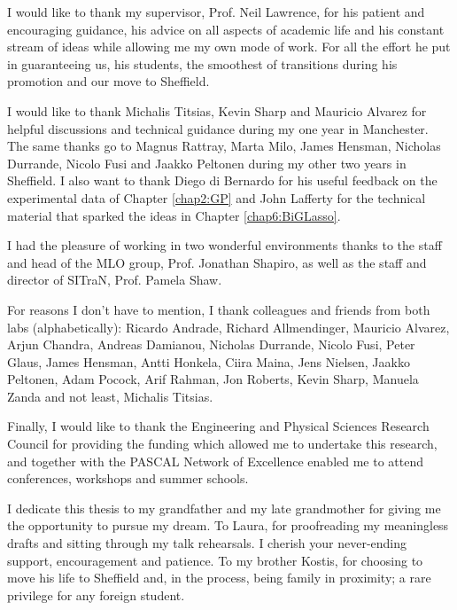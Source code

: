 

\begin{acknowledgements}      %

I would like to thank my supervisor, Prof. Neil Lawrence, for his patient and encouraging guidance, his advice on all aspects of academic life and his constant stream of ideas while allowing me my own mode of work.
For all the effort he put in guaranteeing us, his students, the smoothest of transitions during his promotion and our move to Sheffield.

I would like to thank Michalis Titsias, Kevin Sharp and Mauricio Alvarez for helpful discussions and technical guidance during my one year in Manchester.
The same thanks go to Magnus Rattray, Marta Milo, James Hensman, Nicholas Durrande, Nicolo Fusi and Jaakko Peltonen during my other two years in Sheffield.
I also want to thank Diego di Bernardo for his useful feedback on the experimental data of Chapter \ref{chap2:GP} and John Lafferty for the technical material that sparked the ideas in Chapter \ref{chap6:BiGLasso}.

I had the pleasure of working in two wonderful environments thanks to the staff and head of the MLO group, Prof. Jonathan Shapiro, as well as the staff and director of SITraN, Prof. Pamela Shaw.

For reasons I don't have to mention, I thank colleagues and friends from both labs (alphabetically): Ricardo Andrade, Richard Allmendinger, Mauricio Alvarez, Arjun Chandra, Andreas Damianou, Nicholas Durrande, Nicolo Fusi, Peter Glaus, James Hensman, Antti Honkela, Ciira Maina, Jens Nielsen, Jaakko Peltonen, Adam Pocock, Arif Rahman, Jon Roberts, Kevin Sharp, Manuela Zanda and not least, Michalis Titsias.

Finally, I would like to thank the Engineering and Physical Sciences Research Council for providing the funding which allowed me to undertake this research, and together with the PASCAL Network of Excellence enabled me to attend conferences, workshops and summer schools.

I dedicate this thesis to my grandfather and my late grandmother for giving me the opportunity to pursue my dream. To Laura, for proofreading my meaningless drafts and sitting through my talk rehearsals. I cherish your never-ending support, encouragement and patience. To my brother Kostis, for choosing to move his life to Sheffield and, in the process, being family in proximity; a rare privilege for any foreign student.
      
      

\end{acknowledgements}



